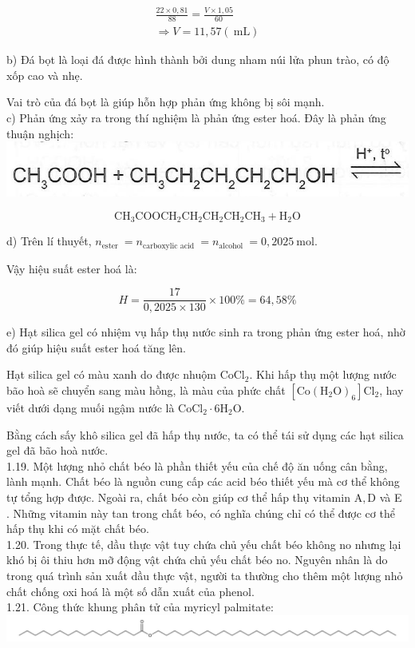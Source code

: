 \documentclass[10pt]{article}
\begin{document}
$$
\begin{gathered}
\frac{22 \times 0,81}{88}=\frac{V \times 1,05}{60} \\
\Rightarrow V=11,57(\mathrm{~mL})
\end{gathered}
$$

b) Đá bọt là loại đá được hình thành bởi dung nham núi lửa phun trào, có độ xốp cao và nhẹ.

Vai trò của đá bọt là giúp hỗn hợp phản ứng không bị sôi mạnh.\\
c) Phản ứng xảy ra trong thí nghiệm là phản ứng ester hoá. Đây là phản ứng thuận nghịch:\\
\includegraphics[max width=\textwidth, center]{2025_10_23_b4e16b74380d0f7e7700g-005}

$$
\mathrm{CH}_{3} \mathrm{COOCH}_{2} \mathrm{CH}_{2} \mathrm{CH}_{2} \mathrm{CH}_{2} \mathrm{CH}_{3}+\mathrm{H}_{2} \mathrm{O}
$$

d) Trên lí thuyết, $n_{\text {ester }}=n_{\text {carboxylic acid }}=n_{\text {alcohol }}=0,2025 \mathrm{~mol}$.

Vậy hiệu suất ester hoá là:

$$
H=\frac{17}{0,2025 \times 130} \times 100 \%=64,58 \%
$$

e) Hạt silica gel có nhiệm vụ hấp thụ nước sinh ra trong phản ứng ester hoá, nhờ đó giúp hiệu suất ester hoá tăng lên.

Hạt silica gel có màu xanh do được nhuộm $\mathrm{CoCl}_{2}$. Khi hấp thụ một lượng nước bão hoà sẽ chuyển sang màu hồng, là màu của phức chất $\left[\mathrm{Co}\left(\mathrm{H}_{2} \mathrm{O}\right)_{6}\right] \mathrm{Cl}_{2}$, hay viết dưới dạng muối ngậm nước là $\mathrm{CoCl}_{2} \cdot 6 \mathrm{H}_{2} \mathrm{O}$.

Bằng cách sấy khô silica gel đã hấp thụ nước, ta có thể tái sử dụng các hạt silica gel đã bão hoà nước.\\
1.19. Một lượng nhỏ chất béo là phần thiết yếu của chế độ ăn uống cân bằng, lành mạnh. Chất béo là nguồn cung cấp các acid béo thiết yếu mà cơ thể không tự tổng hợp được. Ngoài ra, chất béo còn giúp cơ thể hấp thụ vitamin $\mathrm{A}, \mathrm{D}$ và E . Những vitamin này tan trong chất béo, có nghĩa chúng chỉ có thể được cơ thể hấp thụ khi có mặt chất béo.\\
1.20. Trong thực tế, dầu thực vật tuy chứa chủ yếu chất béo không no nhưng lại khó bị ôi thiu hơn mỡ động vật chứa chủ yếu chất béo no. Nguyên nhân là do trong quá trình sản xuất dầu thực vật, người ta thường cho thêm một lượng nhỏ chất chống oxi hoá là một số dẫn xuất của phenol.\\
1.21. Công thức khung phân tử của myricyl palmitate:\\
\includegraphics{smile-540e060fe3678bd7c83941f28ee462932ff24b0e}
\end{document}
